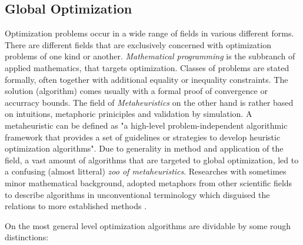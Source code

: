 \documentclass[english]{article}
\begin{document}
\subsection{Global Optimization}
Optimization problems occur in a wide range of fields in various different forms. There are different fields that are exclusively concerned with optimization problems of one kind or another. \textit{Mathematical programming} is the subbranch of applied mathematics, that targets optimization. Classes of problems are stated formally, often together with additional equality or inequality constraints. The solution (algorithm) comes usually with a formal proof of convergence or accurracy bounds. The field of \textit{Metaheuristics}
on the other hand is rather based on intuitions, metaphoric priniciples and validation by simulation. A metaheuristic can be defined as "a high-level problem-independent algorithmic framework that provides a set of guidelines or strategies to develop heuristic optimization algorithms"\cite{sorensen_history_2014}. Due to generality in method and application of the field, a vast amount of algorithms that are targeted to global optimization, led to a confusing (almost litteral) \textit{zoo of metaheuristics}. Researches with sometimes minor mathematical background, adopted metaphors from other scientific fields to describe algorithms in unconventional terminology which disguised the relations to more established methods \cite{sorensen_metaheuristics-metaphor_2015}.


On the most general level optimization algorithms are dividable by some rough distinctions:
\end{document}
